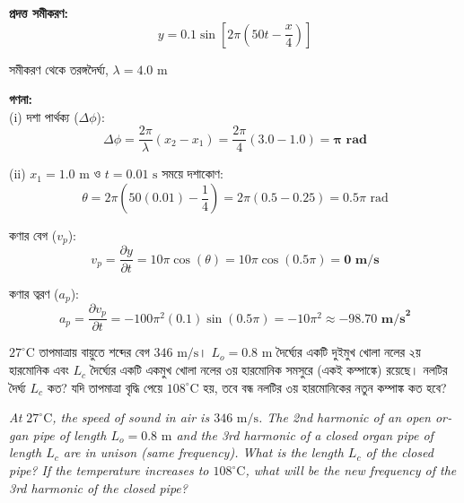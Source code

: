 \documentclass[12pt, a4paper]{article}
\begin{document}
\begin{tcolorbox}[solutionbox={সমাধান (Solution)}]
    \noindent
    \textbf{প্রদত্ত সমীকরণ:}
    \[ y = 0.1 \sin\left[2\pi\left(50t - \frac{x}{4}\right)\right] \]
    
    সমীকরণ থেকে তরঙ্গদৈর্ঘ্য, $\lambda = 4.0\text{ m}$

    \vspace{0.6em}
    \noindent\textbf{গণনা:} \\
    (i) দশা পার্থক্য ($\Delta \phi$):
    \[ \Delta \phi = \frac{2\pi}{\lambda} (x_2 - x_1) = \frac{2\pi}{4} (3.0 - 1.0) = \mathbf{\pi\text{ rad}} \]
    
    (ii) $x_1 = 1.0\text{ m}$ ও $t = 0.01\text{ s}$ সময়ে দশাকোণ:
    \[ \theta = 2\pi\left(50(0.01) - \frac{1}{4}\right) = 2\pi(0.5 - 0.25) = 0.5\pi\text{ rad} \]
    
    কণার বেগ ($v_p$):
    \[ v_p = \frac{\partial y}{\partial t} = 10\pi \cos(\theta) = 10\pi \cos(0.5\pi) = \mathbf{0\text{ m/s}} \]
    
    কণার ত্বরণ ($a_p$):
    \[ a_p = \frac{\partial v_p}{\partial t} = -100\pi^2 (0.1) \sin(0.5\pi) = -10\pi^2 \approx \mathbf{-98.70\text{ m/s}^2} \]
\end{tcolorbox}


\begin{tcolorbox}[questionbox={প্রশ্ন (Question) 13}]
    \noindent
    $27^\circ\text{C}$ তাপমাত্রায় বায়ুতে শব্দের বেগ $346\text{ m/s}$। $L_o = 0.8\text{ m}$ দৈর্ঘ্যের একটি দুইমুখ খোলা নলের ২য় হারমোনিক এবং $L_c$ দৈর্ঘ্যের একটি একমুখ খোলা নলের ৩য় হারমোনিক সমসুরে (একই কম্পাঙ্কে) রয়েছে। নলটির দৈর্ঘ্য $L_c$ কত? যদি তাপমাত্রা বৃদ্ধি পেয়ে $108^\circ\text{C}$ হয়, তবে বন্ধ নলটির ৩য় হারমোনিকের নতুন কম্পাঙ্ক কত হবে?
    
    \vspace{0.8em}
    \begin{english}
    \noindent\textit{\color{darkgray}
    At $27^\circ\text{C}$, the speed of sound in air is $346\text{ m/s}$. The 2nd harmonic of an open organ pipe of length $L_o = 0.8\text{ m}$ and the 3rd harmonic of a closed organ pipe of length $L_c$ are in unison (same frequency). What is the length $L_c$ of the closed pipe? If the temperature increases to $108^\circ\text{C}$, what will be the new frequency of the 3rd harmonic of the closed pipe?
    }
    \end{english}
\end{tcolorbox}
\end{document}
